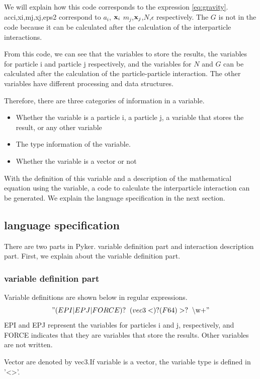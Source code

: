 \documentclass[ams, a4j]{U-AizuGT}
\begin{document}
We will explain how this code corresponds to the expression 
\eqref{eq:gravity}.
acci,xi,mj,xj,eps2 correspond to
 $a_i$, $\vb{x}_i$ $m_j$,$\vb{x}_j$,$N$,$\epsilon$ respectively.
The $G$ is not in the code because it can be calculated after the 
calculation of the interparticle interactions.


 From this code, we can see that the variables to store the results, 
the variables for particle i and particle j respectively, and the 
variables for $N$ and $G$ can be calculated after the calculation of 
the particle-particle interaction. The other variables have different 
processing and data structures.


 Therefore, there are three categories of information in a variable.
\begin{itemize}
  \item Whether the variable is a particle i, a particle j, a
  variable that stores the result, or any other variable
  \item The type information of the variable.
  \item Whether the variable is a vector or not
\end{itemize}

 With the definition of this variable and a description of the
mathematical equation using the variable, a code to calculate the
interparticle interaction can be generated.
We explain the language specification in the next section.

\subsection{language specification}
There are two parts in Pyker. variable definition part and 
interaction description part.
First, we explain about the variable definition part.

\subsubsection{variable definition part}
Variable definitions are shown below in regular expressions.
\["(EPI|EPJ|FORCE)?\:\text{ } (vec3<)?(F64)>?\:\text{ } \text{\textbackslash w+}"\]
EPI and EPJ represent the variables for particles i and j, 
respectively, and FORCE indicates that they are variables that
 store the results.   Other variables are not written.


 Vector are denoted by vec3.If variable is a vector, the variable type
 is defined in '<>'.
\end{document}
